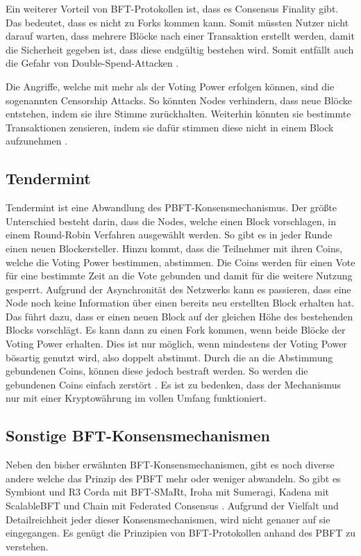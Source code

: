 Ein weiterer Vorteil von \acs{BFT}-Protokollen ist, dass es Consensus Finality gibt. Das bedeutet, dass es nicht zu Forks kommen kann. Somit müssten Nutzer nicht darauf warten, dass mehrere Blöcke nach einer Transaktion erstellt werden, damit die Sicherheit gegeben ist, dass diese endgültig bestehen wird. Somit entfällt auch die Gefahr von Double-Spend-Attacken \cite{Vukolicquestscalableblockchain2015}.

Die Angriffe, welche mit mehr als  der Voting Power erfolgen können, sind die sogenannten Censorship Attacks. So könnten Nodes verhindern, dass neue Blöcke entstehen, indem sie ihre Stimme zurückhalten. Weiterhin könnten sie bestimmte Transaktionen zensieren, indem sie dafür stimmen diese nicht in einem Block aufzunehmen \cite{TendermintTeamTendermintGithubRepository2018}.

\subsection{Tendermint}
Tendermint ist eine Abwandlung des \acs{PBFT}-Konsensmechanismus. Der größte Unterschied besteht darin, dass die Nodes, welche einen Block vorschlagen, in einem Round-Robin Verfahren ausgewählt werden. So gibt es in jeder Runde einen neuen Blockersteller. Hinzu kommt, dass die Teilnehmer mit ihren Coins, welche die Voting Power bestimmen, abstimmen. Die Coins werden für einen Vote für eine bestimmte Zeit an die Vote gebunden und damit für die weitere Nutzung gesperrt. Aufgrund der Asynchronität des Netzwerks kann es passieren, dass eine Node noch keine Information über einen bereits neu erstellten Block erhalten hat. Das führt dazu, dass er einen neuen Block auf der gleichen Höhe des bestehenden Blocks vorschlägt. Es kann dann zu einen Fork kommen, wenn beide Blöcke  der Voting Power erhalten. Dies ist nur möglich, wenn mindestens  der Voting Power bösartig genutzt wird, also doppelt abstimmt. Durch die an die Abstimmung gebundenen Coins, können diese jedoch bestraft werden. So werden die gebundenen Coins einfach zerstört \cite{KwonTendermintConsensusmining2014}\cite{BuchmanTendermintByzantineFault2016}. Es ist zu bedenken, dass der Mechanismus nur mit einer Kryptowährung im vollen Umfang funktioniert.

\subsection{Sonstige BFT-Konsensmechanismen}
Neben den bisher erwähnten \acs{BFT}-Konsensmechanismen, gibt es noch diverse andere welche das Prinzip des PBFT mehr oder weniger abwandeln. So gibt es Symbiont und R3 Corda mit BFT-SMaRt, Iroha mit Sumeragi, Kadena mit ScalableBFT und Chain mit Federated Consensus \cite{CachinBlockchainConsensusProtocols2017}. Aufgrund der Vielfalt und Detailreichheit jeder dieser Konsensmechanismen, wird nicht genauer auf sie eingegangen. Es genügt die Prinzipien von \acs{BFT}-Protokollen anhand des \acs{PBFT} zu verstehen.

